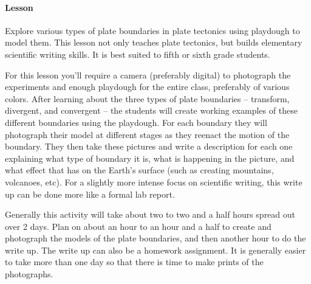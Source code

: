 \paragraph{Lesson} Explore various types of plate boundaries in plate tectonics
using playdough to model them. This lesson not only teaches plate tectonics, but
builds elementary scientific writing skills. It is best suited to fifth or sixth
grade students.

For this lesson you'll require a camera (preferably digital) to photograph the
experiments and enough playdough for the entire class, preferably of various
colors. After learning about the three types of plate boundaries -- transform,
divergent, and convergent -- the students will create working examples of these
different boundaries using the playdough. For each boundary they will photograph
their model at different stages as they reenact the motion of the boundary. They
then take these pictures and write a description for each one explaining what
type of boundary it is, what is happening in the picture, and what effect
that has on the Earth's surface (such as creating mountains, volcanoes, etc).
For a slightly more intense focus on scientific writing, this write up can be
done more like a formal lab report.

Generally this activity will take about two to two and a half hours spread out
over 2 days. Plan on about an hour to an hour and a half to create and
photograph the models of the plate boundaries, and then another hour to do the
write up. The write up can also be a homework assignment. It is generally easier
to take more than one day so that there is time to make prints of the
photographs.
